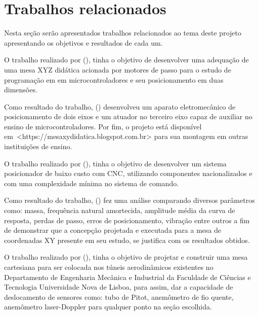 \section{Trabalhos relacionados}\label{sec:trabalhos}

Nesta seção serão apresentados trabalhos relacionados ao tema deste projeto apresentando os objetivos e resultados 
de cada um.

O trabalho realizado por \citeauthor{butignol2017adequaccao} (\citeyear{butignol2017adequaccao}), 
tinha o objetivo de desenvolver uma adequação de uma mesa XYZ didática acionada por motores 
de passo para o estudo de programação em em microcontroladores e seu posicionamento em duas dimensões.

Como resultado do trabalho, \citeauthor{butignol2017adequaccao} (\citeyear{butignol2017adequaccao}) 
desenvolveu um aparato eletromecânico de posicionamento de dois eixos e um atuador no terceiro eixo 
capaz de auxiliar no ensino de microcontroladores. Por fim, o projeto está disponível 
em~<https://mesaxydidatica.blogspot.com.br> para sua montagem em outras instituições de ensino.

O trabalho realizado por \citeauthor{camargo1988mesa} (\citeyear{camargo1988mesa}), tinha o objetivo de 
desenvolver um sistema posicionador de baixo custo com \acrfull{CNC}, utilizando componentes 
nacionalizados e com uma complexidade mínima no sistema de comando.

Como resultado do trabalho, \citeauthor{camargo1988mesa} (\citeyear{camargo1988mesa}) fez uma análise 
comparando diversos parâmetros como: massa, frequência natural amortecida, amplitude média da curva de 
resposta, perdas de passo, erros de posicionamento, vibração entre outros a fim de demonstrar que a 
concepção projetada e executada para a mesa de coordenadas XY presente em seu estudo, se 
justifica com os resultados obtidos.

O trabalho realizado por \citeauthor{ramos2018desenvolvimento} (\citeyear{ramos2018desenvolvimento}), 
tinha o objetivo de projetar e construir uma mesa cartesiana para ser colocada nos túneis 
aerodinâmicos existentes no Departamento de Engenharia Mecânica e Industrial da Faculdade de Ciências e 
Tecnologia Universidade Nova de Lisboa, para assim, dar a capacidade de deslocamento de sensores como: tubo de Pitot, 
anemômetro de fio quente, anemômetro laser-Doppler para qualquer ponto na seção escolhida.

